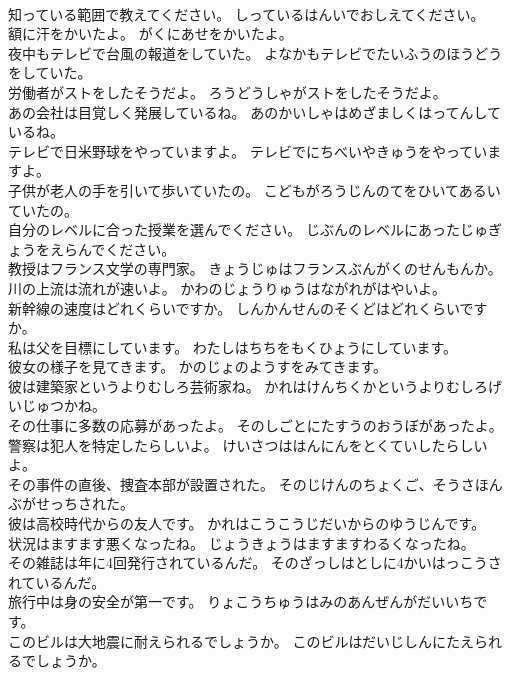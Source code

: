 \documentclass[8pt]{extreport}
\begin{document}
\begin{CJK}{UTF8}{min}
\\	知っている範囲で教えてください。	しっているはんいでおしえてください。 
\\	額に汗をかいたよ。	がくにあせをかいたよ。 
\\	夜中もテレビで台風の報道をしていた。	よなかもテレビでたいふうのほうどうをしていた。 
\\	労働者がストをしたそうだよ。	ろうどうしゃがストをしたそうだよ。 
\\	あの会社は目覚しく発展しているね。	あのかいしゃはめざましくはってんしているね。 
\\	テレビで日米野球をやっていますよ。	テレビでにちべいやきゅうをやっていますよ。 
\\	子供が老人の手を引いて歩いていたの。	こどもがろうじんのてをひいてあるいていたの。 
\\	自分のレベルに合った授業を選んでください。	じぶんのレベルにあったじゅぎょうをえらんでください。 
\\	教授はフランス文学の専門家。	きょうじゅはフランスぶんがくのせんもんか。 
\\	川の上流は流れが速いよ。	かわのじょうりゅうはながれがはやいよ。 
\\	新幹線の速度はどれくらいですか。	しんかんせんのそくどはどれくらいですか。 
\\	私は父を目標にしています。	わたしはちちをもくひょうにしています。 
\\	彼女の様子を見てきます。	かのじょのようすをみてきます。 
\\	彼は建築家というよりむしろ芸術家ね。	かれはけんちくかというよりむしろげいじゅつかね。 
\\	その仕事に多数の応募があったよ。	そのしごとにたすうのおうぼがあったよ。 
\\	警察は犯人を特定したらしいよ。	けいさつははんにんをとくていしたらしいよ。 
\\	その事件の直後、捜査本部が設置された。	そのじけんのちょくご、そうさほんぶがせっちされた。 
\\	彼は高校時代からの友人です。	かれはこうこうじだいからのゆうじんです。 
\\	状況はますます悪くなったね。	じょうきょうはますますわるくなったね。 
\\	その雑誌は年に4回発行されているんだ。	そのざっしはとしに4かいはっこうされているんだ。 
\\	旅行中は身の安全が第一です。	りょこうちゅうはみのあんぜんがだいいちです。 
\\	このビルは大地震に耐えられるでしょうか。	このビルはだいじしんにたえられるでしょうか。 

\end{CJK}
\end{document}

